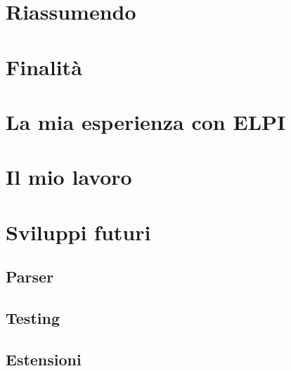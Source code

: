 \documentclass[12pt,a4paper,openright,twoside]{report}
\begin{document}


\section{Riassumendo}

\section{Finalità}

\section{La mia esperienza con ELPI}

\section{Il mio lavoro}

\section{Sviluppi futuri}
\subsection{Parser}
\subsection{Testing}
\subsection{Estensioni}

\clearpage{\pagestyle{empty}\cleardoublepage}		%


\appendix   %

\end{document}
